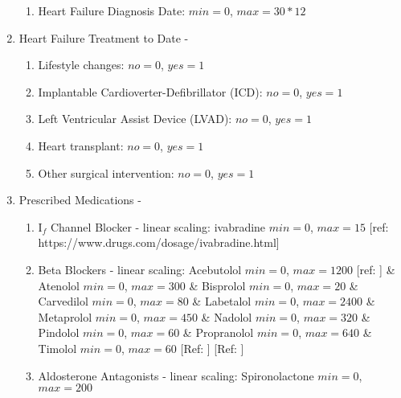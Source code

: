 \documentclass[]{article}
\begin{document}
\begin{enumerate}
\begin{enumerate}
		\item Heart Failure Diagnosis Date: \(min = 0\), \(max = 30*12\)
	\end{enumerate}
	\item Heart Failure Treatment to Date -
	\begin{enumerate}
		\item Lifestyle changes: \(no = 0\), \(yes = 1\)
		\item Implantable Cardioverter-Defibrillator (ICD): \(no = 0\), \(yes = 1\)
		\item Left Ventricular Assist Device (LVAD): \(no = 0\), \(yes = 1\)
		\item Heart transplant: \(no = 0\), \(yes = 1\)
		\item Other surgical intervention: \(no = 0\), \(yes = 1\)
	\end{enumerate}
	\item Prescribed Medications -
	\begin{enumerate}
		\item I$_f$ Channel Blocker - linear scaling: ivabradine \(min = 0\), \(max = 15\) [ref: https://www.drugs.com/dosage/ivabradine.html]
		\item Beta Blockers - linear scaling: Acebutolol \(min = 0\), \(max = 1200\) [ref: ] \linebreak \& Atenolol \(min = 0\), \(max = 300\)  %
		\& Bisprolol \(min = 0\), \(max = 20\)  %
		\linebreak \& Carvedilol \(min = 0\), \(max = 80\)  %
		\& Labetalol \(min = 0\), \(max = 2400\)  %
		\& Metaprolol \(min = 0\), \(max = 450\)  %
		\& Nadolol \(min = 0\), \(max = 320\)  %
		\linebreak \& Pindolol \(min = 0\), \(max = 60\)  %
		\& Propranolol \(min = 0\), \(max = 640\)  %
		\& Timolol \(min = 0\), \(max = 60\)  %
		[Ref: ]
		[Ref: ]
		\item Aldosterone Antagonists - linear scaling: Spironolactone \(min = 0\), \(max = 200\) 

\end{enumerate}
\end{enumerate}
\end{document}
